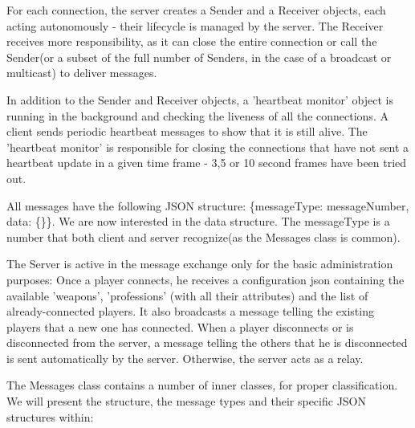 \documentclass{article}
\begin{document}
For each connection, the server creates a Sender and a Receiver objects, each
acting autonomously - their lifecycle is managed by the server. The Receiver
receives more responsibility, as it can close the entire connection or call the
Sender(or a subset of the full number of Senders, in the case of a broadcast or
multicast) to deliver messages.\newline

In addition to the Sender and Receiver objects, a 'heartbeat monitor' object is
running in the background and checking the liveness of all the connections. A
client sends periodic heartbeat messages to show that it is still alive. The
'heartbeat monitor' is responsible for closing the connections that have not
sent a heartbeat update in a given time frame - 3,5 or 10 second frames have
been tried out.\newline

All messages have the following JSON structure: \{messageType: messageNumber,
data: \{\}\}. We are now interested in the data structure. The messageType is a
number that both client and server recognize(as the Messages class is
common).\newline

The Server is active in the message exchange only for the basic administration
purposes: Once a player connects, he receives a configuration json containing
the available 'weapons', 'professions' (with all their attributes) and the list
of already-connected players. It also broadcasts a message telling the existing
players that a new one has connected. When a player disconnects or is
disconnected from the server, a message telling the others that he is
disconnected is sent automatically by the server. Otherwise, the server acts as
a relay.\newline

The Messages class contains a number of inner classes, for proper
classification. We will present the structure, the message types and their
specific JSON structures within:
\end{document}
